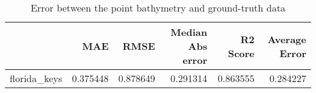 \begin{table}[h!]
\caption{Error between the point bathymetry and ground-truth data}
\label{tab:florida_keys_lidar_error}
\begin{tabular}{lrrrrr}
\toprule
 & MAE & RMSE & Median Abs error & R2 Score & Average Error \\
\midrule
florida_keys & 0.375448 & 0.878649 & 0.291314 & 0.863555 & 0.284227 \\
\bottomrule
\end{tabular}
\end{table}
